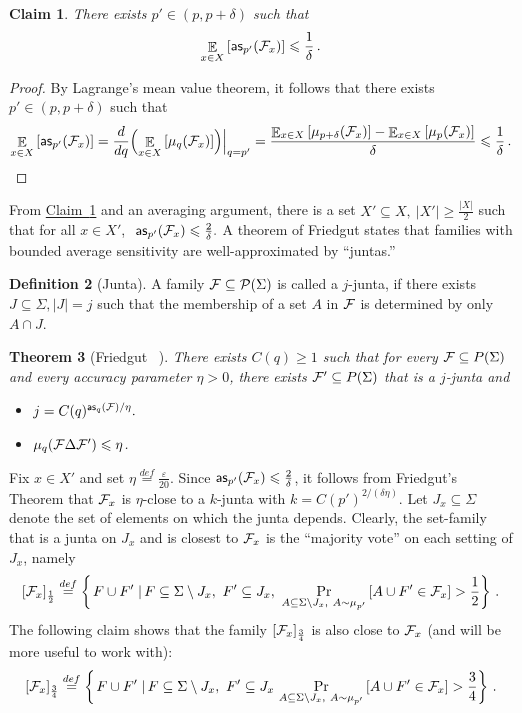 \documentclass[11pt]{article}
\numberwithin{equation}{section}
\newtheorem{theorem}{Theorem}[section]
\newtheorem{claim}[theorem]{Claim}
\theoremstyle{definition}
\newtheorem{definition}[theorem]{Definition}
\theoremstyle{plain}
\newcommand{\expref}[2]{\hyperref[#2]{#1~\ref{#2}}}
\newcommand\sett[2]{\left\{ \left. #1 \;\right\vert #2 \right\}}
\newcommand\Prob[2]{{\Pr_{#1}\left[ {#2} \right]}}
\newcommand\half{{1\over2}}
\newcommand\defeq{\stackrel{def}{=}}
\newcommand\Expect[2]{{\mathop{\mathbb{E}}_{#1}\left[ {#2} \right]}}
\newcommand\eps{\varepsilon}
\renewcommand\geq{\geqslant}
\begin{document}
\begin{claim}\label{clm:as}
There exists $p'\in (p,p+\delta)$ such that
\[
\Expect{x\in X}{{\sf as}_{p'}({\cal F}_x)} \leqslant \frac{1}{\delta}\,.%
\]
\end{claim}
\begin{proof}
By Lagrange's mean value theorem, it follows that there exists $p'\in (p,p+\delta)$ such that
\[
\Expect{x\in X}{{\sf as}_{p'}({\cal F}_x)}=
\frac{d}{dq}\Big( \Expect{x\in X}{\mu_{q}({\cal F}_x)}     \Big) \Big|_{q=p'} =
\frac
{
\Expect{x\in X}{\mu_{p+\delta}({\cal F}_x)}
-\Expect{x\in X}{\mu_{p}({\cal F}_x)}
}
{\delta}
\leqslant \frac{1}{\delta}\,.   \qedhere%
\]
\end{proof}
From \expref{Claim}{clm:as} and an averaging argument, there is a set $X' \subseteq X, ~|X'| \geq \frac{|X|}{2}$ such that
for all $x \in X'$, $~{\sf as}_{p'}({\cal F}_x)\leqslant \frac{2}{\delta}.$ A theorem of Friedgut states that families
with bounded average sensitivity are well-approximated by ``juntas.''

\begin{definition}[Junta]
A family ${\cal F}\subseteq {\cal P}(\Sigma)$ is called a $j$-junta, if there exists $J\subseteq \Sigma, |J|=j$ such that the membership of a set
$A$ in ${\cal F}$ is determined by only $A\cap J$.
\end{definition}



\begin{theorem}[Friedgut ~\cite{Friedgut98}]
There exists %
$C(q) \geq 1$ such that for every
${\cal F}\subseteq P(\Sigma)$ and %
every  %
accuracy parameter $\eta>0$,
there exists ${\cal F}'\subseteq P(\Sigma)$ that is a $j$-junta and
\begin{itemize}
\item $j = C(q)^{ {\sf as}_q ({\cal F})/\eta}. $
\item $\mu_{q}({\cal F}\Delta{\cal F}')\leqslant \eta$.
\end{itemize}
\end{theorem}

Fix $x\in X'$ and set $\eta\defeq \frac{\eps}{20}$.
Since ${\sf as}_{p'}({\cal F}_x) \leqslant \frac{2}{\delta}$,
it follows from Friedgut's Theorem that ${\cal F}_x$ is $\eta$-close to a $k$-junta with $k = C(p')^{2/(\delta \eta)}$. Let $J_x \subseteq \Sigma$
denote the set of elements  on which the junta depends. Clearly, the set-family that is a junta on $J_x$ and is closest to ${\cal F}_x$
 is the ``majority vote'' on each setting of $J_x$, namely
\[
[{\cal F}_x]_\half\defeq \sett{F\cup F'}{F\subseteq\Sigma\setminus J_x, ~F' \subseteq J_x, ~\Prob{A\subseteq \Sigma\setminus J_x, ~A \sim \mu_{p'}}{A\cup F'\in{\cal F}_x} > \half}\,.%
\]
The following claim shows that the family $[{\cal F}_x]_{\frac{3}{4}}$ is also close to ${\cal F}_x$ (and will be more useful to work with):
\[
[{\cal F}_x]_{\frac{3}{4}}\defeq \sett{F\cup F'}{F\subseteq\Sigma\setminus J_x, ~F'\subseteq J_x ~\Prob{A\subseteq \Sigma\setminus J_x, ~A\sim \mu_{p'}}{A\cup F'\in {\cal F}_x} > \frac{3}{4}}\,.%
\]
\end{document}
